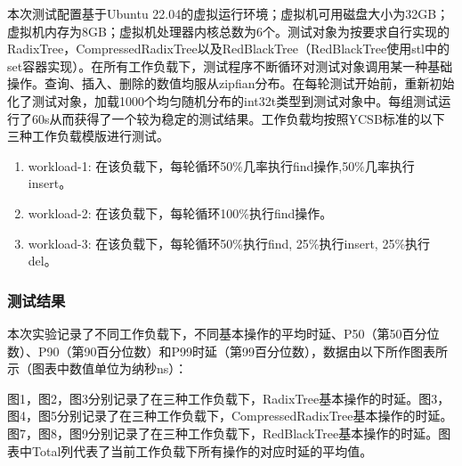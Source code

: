 \documentclass[]{article}
\begin{document}
本次测试配置基于Ubuntu 22.04的虚拟运行环境；虚拟机可用磁盘大小为32GB；虚拟机内存为8GB；虚拟机处理器内核总数为6个。测试对象为按要求自行实现的RadixTree，CompressedRadixTree以及RedBlackTree（RedBlackTree使用stl中的set容器实现）。在所有工作负载下，测试程序不断循环对测试对象调用某一种基础操作。查询、插⼊、删除的数值均服从zipfian分布。在每轮测试开始前，重新初始化了测试对象，加载1000个均匀随机分布的int32t类型到测试对象中。每组测试运行了60s从而获得了一个较为稳定的测试结果。工作负载均按照YCSB标准的以下三种工作负载模版进行测试。

\begin{enumerate}
    \item workload-1: 在该负载下，每轮循环50\%⼏率执⾏find操作,50\%⼏率执⾏insert。
    \item workload-2: 在该负载下，每轮循环100\%执⾏find操作。
    \item workload-3: 在该负载下，每轮循环50\%执⾏find, 25\%执⾏insert, 25\%执⾏del。
\end{enumerate}

\subsubsection{测试结果}

本次实验记录了不同工作负载下，不同基本操作的平均时延、P50（第50百分位数）、P90（第90百分位数）和P99时延（第99百分位数），数据由以下所作图表所示（图表中数值单位为纳秒ns）：

图1，图2，图3分别记录了在三种工作负载下，RadixTree基本操作的时延。图3，图4，图5分别记录了在三种工作负载下，CompressedRadixTree基本操作的时延。图7，图8，图9分别记录了在三种工作负载下，RedBlackTree基本操作的时延。图表中Total列代表了当前工作负载下所有操作的对应时延的平均值。
\end{document}
